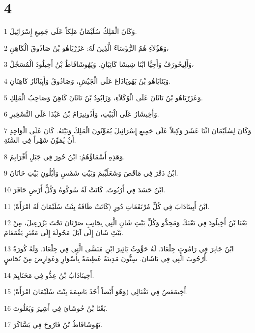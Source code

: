 \chapter{4}

\par 1 وَكَانَ الْمَلِكُ سُلَيْمَانُ مَلِكاً عَلَى جَمِيعِ إِسْرَائِيلَ.
\par 2 وَهَؤُلاَءِ هُمُ الرُّؤَسَاءُ الَّذِينَ لَهُ: عَزَرْيَاهُو بْنُ صَادُوقَ الْكَاهِنِ،
\par 3 وَأَلِيحُورَفُ وَأَخِيَّا ابْنَا شِيشَا كَاتِبَانِ. وَيَهُوشَافَاطُ بْنُ أَخِيلُودَ الْمُسَجِّلُ،
\par 4 وَبَنَايَاهُو بْنُ يَهُويَادَاعَ عَلَى الْجَيْشِ، وَصَادُوقُ وَأَبِيَاثَارُ كَاهِنَانِ.
\par 5 وَعَزَرْيَاهُو بْنُ نَاثَانَ عَلَى الْوُكَلاَءِ، وَزَابُودُ بْنُ نَاثَانَ كَاهِنٌ وَصَاحِبُ الْمَلِكِ.
\par 6 وَأَخِيشَارُ عَلَى الْبَيْتِ، وَأَدُونِيرَامُ بْنُ عَبْدَا عَلَى التَّسْخِيرِ.
\par 7 وَكَانَ لِسُلَيْمَانَ اثْنَا عَشَرَ وَكِيلاً عَلَى جَمِيعِ إِسْرَائِيلَ يُمَوِّنُونَ الْمَلِكَ وَبَيْتَهُ. كَانَ عَلَى الْوَاحِدِ أَنْ يُمَوِّنَ شَهْراً فِي السَّنَةِ.
\par 8 وَهَذِهِ أَسْمَاؤُهُمُ: ابْنُ حُورَ فِي جَبَلِ أَفْرَايِمَ.
\par 9 ابْنُ دَقَرَ فِي مَاقَصَ وَشَعَلُبِّيمَ وَبَيْتِ شَمْسٍ وَأَيْلُونِ بَيْتِ حَانَانَ.
\par 10 ابْنُ حَسَدَ فِي أَرُبُوتَ. كَانَتْ لَهُ سُوكُوهُ وَكُلُّ أَرْضِ حَافَرَ.
\par 11 ابْنُ أَبِينَادَابَ فِي كُلِّ مُرْتَفَعَاتِ دُورٍ (كَانَتْ طَافَةُ بِنْتُ سُلَيْمَانَ لَهُ امْرَأَةً).
\par 12 بَعْنَا بْنُ أَخِيلُودَ فِي تَعْنَكَ وَمَجِدُّو وَكُلِّ بَيْتِ شَانٍ الَّتِي بِجَانِبِ صَرْتَانَ تَحْتَ يَزْرَعِيلَ، مِنْ بَيْتَِ شَانَ إِلَى آبَلَ مَحُولَةَ إِلَى مَعْبَرِ يَقْمَعَامَ.
\par 13 ابْنُ جَابِرَ فِي رَامُوتِ جِلْعَادَ. لَهُ حَوُّوثُ يَائِيرَ ابْنِ مَنَسَّى الَّتِي فِي جِلْعَادَ. وَلَهُ كُورَةُ أَرْجُوبَ الَّتِي فِي بَاشَانَ. سِتُّونَ مَدِينَةً عَظِيمَةً بِأَسْوَارٍ وَعَوَارِضَ مِنْ نُحَاسٍ.
\par 14 أَخِينَادَابُ بْنُ عِدُّو فِي مَحَنَايِمَ.
\par 15 أَخِيمَعَصُ فِي نَفْتَالِي (وَهُوَ أَيْضاً أَخَذَ بَاسِمَةَ بِنْتَ سُلَيْمَانَ امْرَأَةً).
\par 16 بَعْنَا بْنُ حُوشَايَ فِي أَشِيرَ وَبَعَلُوتَ.
\par 17 يَهُوشَافَاطُ بْنُ فَارُوحَ فِي يَسَّاكَرَ.
